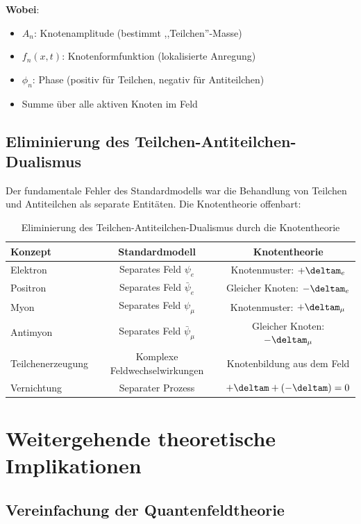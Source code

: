 	\textbf{Wobei}:
	\begin{itemize}
		\item $A_n$: Knotenamplitude (bestimmt ,,Teilchen''-Masse)
		\item $f_n(x,t)$: Knotenformfunktion (lokalisierte Anregung)
		\item $\phi_n$: Phase (positiv für Teilchen, negativ für Antiteilchen)
		\item Summe über alle aktiven Knoten im Feld
	\end{itemize}
	
	\subsection{Eliminierung des Teilchen-Antiteilchen-Dualismus}
	
	Der fundamentale Fehler des Standardmodells war die Behandlung von Teilchen und Antiteilchen als separate Entitäten. Die Knotentheorie offenbart:
	
	\begin{table}[htbp]
		\centering
		\begin{tabular}{lcc}
			\toprule
			\textbf{Konzept} & \textbf{Standardmodell} & \textbf{Knotentheorie} \\
			\midrule
			Elektron & Separates Feld $\psi_e$ & Knotenmuster: $+\deltam_e$ \\
			Positron & Separates Feld $\bar{\psi}_e$ & Gleicher Knoten: $-\deltam_e$ \\
			Myon & Separates Feld $\psi_{\mu}$ & Knotenmuster: $+\deltam_{\mu}$ \\
			Antimyon & Separates Feld $\bar{\psi}_{\mu}$ & Gleicher Knoten: $-\deltam_{\mu}$ \\
			Teilchenerzeugung & Komplexe Feldwechselwirkungen & Knotenbildung aus dem Feld \\
			Vernichtung & Separater Prozess & $+\deltam + (-\deltam) = 0$ \\
			\bottomrule
		\end{tabular}
		\caption{Eliminierung des Teilchen-Antiteilchen-Dualismus durch die Knotentheorie}
		\label{tab:node_theory_comparison}
	\end{table}
	
	\section{Weitergehende theoretische Implikationen}
	
	\subsection{Vereinfachung der Quantenfeldtheorie}
	
